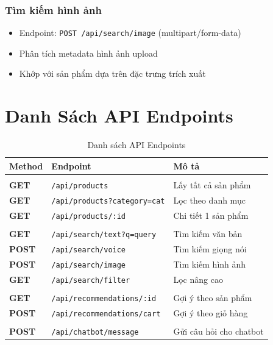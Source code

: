 \documentclass[12pt, a4paper]{report}
\begin{document}
\subsection{Tìm kiếm hình ảnh}
\begin{itemize}
    \item Endpoint: \texttt{POST /api/search/image} (multipart/form-data)
    \item Phân tích metadata hình ảnh upload
    \item Khớp với sản phẩm dựa trên đặc trưng trích xuất
\end{itemize}

\chapter{Danh Sách API Endpoints}

\begin{table}[H]
    \centering
    \caption{Danh sách API Endpoints}
    \begin{tabular}{>{\bfseries}p{1.8cm}p{5.5cm}p{5.5cm}}
        \toprule
        \textbf{Method} & \textbf{Endpoint} & \textbf{Mô tả} \\
        \midrule
        \multicolumn{3}{l}{\textit{\textbf{Sản phẩm}}} \\
        GET    & \texttt{/api/products}                & Lấy tất cả sản phẩm \\
        GET    & \texttt{/api/products?category=cat}   & Lọc theo danh mục \\
        GET    & \texttt{/api/products/:id}            & Chi tiết 1 sản phẩm \\
        \midrule
        \multicolumn{3}{l}{\textit{\textbf{Tìm kiếm}}} \\
        GET    & \texttt{/api/search/text?q=query}     & Tìm kiếm văn bản \\
        POST   & \texttt{/api/search/voice}            & Tìm kiếm giọng nói \\
        POST   & \texttt{/api/search/image}            & Tìm kiếm hình ảnh \\
        GET    & \texttt{/api/search/filter}           & Lọc nâng cao \\
        \midrule
        \multicolumn{3}{l}{\textit{\textbf{Gợi ý}}} \\
        GET    & \texttt{/api/recommendations/:id}     & Gợi ý theo sản phẩm \\
        POST   & \texttt{/api/recommendations/cart}    & Gợi ý theo giỏ hàng \\
        \midrule
        \multicolumn{3}{l}{\textit{\textbf{Chatbot}}} \\
        POST   & \texttt{/api/chatbot/message}         & Gửi câu hỏi cho chatbot \\
        \bottomrule
    \end{tabular}
\end{table}
\end{document}
